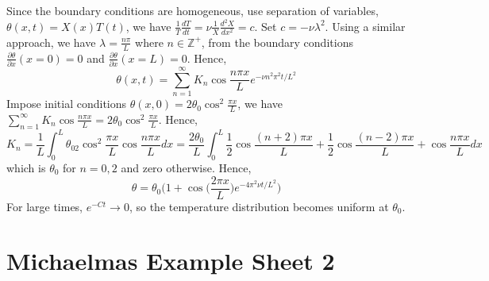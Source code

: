 \documentclass[a4paper]{article}
\begin{document}
\begin{ans}
Since the boundary conditions are homogeneous, use separation of variables, $\theta(x,t)=X(x)T(t)$, we have $\frac{1}{T}\frac{dT}{dt}=\nu\frac{1}{X}\frac{d^2X}{dx^2}=c$. Set $c=-\nu\lambda^2$. Using a similar approach, we have $\lambda=\frac{n\pi}{L}$ where $n\in\mathbb{Z}^+$, from the boundary conditions  $\frac{\partial\theta}{\partial x}(x=0)=0$ and $\frac{\partial\theta}{\partial x}(x=L)=0$. Hence,
$$\theta(x,t)=\sum_{n=1}^\infty K_n\cos\frac{n\pi x}{L}e^{-\nu n^2\pi^2t/L^2}$$
Impose initial conditions $\theta(x,0)=2\theta_0\cos^2\frac{\pi x}{L}$, we have $\sum_{n=1}^\infty K_n\cos\frac{n\pi x}{L}=2\theta_0\cos^2\frac{\pi x}{L}$. Hence,
$$K_n=\frac{1}{L}\int_0^L\theta_02\cos^2\frac{\pi x}{L}\cos\frac{n\pi x}{L}dx=\frac{2\theta_0}{L}\int_0^L\frac{1}{2}\cos\frac{(n+2)\pi x}{L}+\frac{1}{2}\cos\frac{(n-2)\pi x}{L}+\cos\frac{n\pi x}{L}dx$$
which is $\theta_0$ for $n=0,2$ and zero otherwise. Hence,
$$\theta=\theta_0\bigg(1+\cos\bigg(\frac{2\pi x}{L}\bigg)e^{-4\pi^2\nu t/L^2}\bigg)$$
For large times, $e^{-Ct}\rightarrow 0$, so the temperature distribution becomes uniform at $\theta_0$.
\end{ans}
\newpage
\section{Michaelmas Example Sheet 2}
\end{document}
